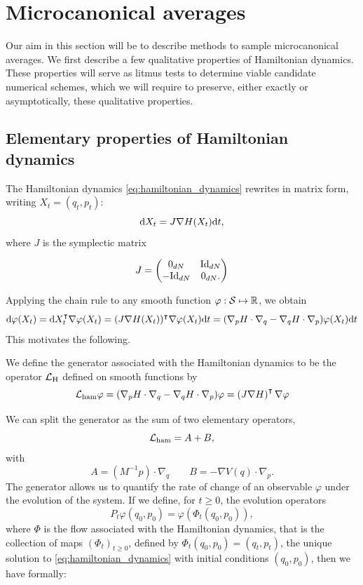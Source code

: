 \section{Microcanonical averages}
Our aim in this section will be to describe methods to sample microcanonical averages. We first describe a few qualitative properties of Hamiltonian dynamics. 
These properties will serve as litmus tests to determine viable candidate numerical schemes, which we will require to preserve, either exactly or asymptotically, 
these qualitative properties.

\subsection{Elementary properties of Hamiltonian dynamics}
The Hamiltonian dynamics \eqref{eq:hamiltonian_dynamics} rewrites in matrix form, writing $X_t=(q_t,p_t)$:
\begin{equation}\label{eq:hamiltonian_dynamics_matrix_form} \text d X_t=J\nabla H(X_t)\mathrm{d}t,\end{equation}
where $J$ is the symplectic matrix

$$J = \begin{pmatrix}
    0_{dN} & \mathrm{Id}_{dN}\\ -\mathrm{Id}_{dN} & 0_{dN}.
\end{pmatrix}$$

Applying the chain rule to any smooth function $\varphi: \mathcal{S} \mapsto \mathbb{R}$, we obtain
        $$ \text d \varphi(X_t)= \text d X_t^{\intercal} \nabla \varphi(X_t)=(J \nabla H(X_t))^\intercal \nabla \varphi(X_t)\mathrm{d}t=(\nabla_p H \cdot \nabla_q - \nabla_q H \cdot \nabla_p)\varphi(X_t)\mathrm{d}t$$
        This motivates the following.
        \begin{definition}
            We define the generator associated with the Hamiltonian dynamics to be the operator $\mathcal{L}_{\text{H}}$ defined on smooth functions by
        \begin{equation}
            \label{eq:hamiltonian_generator}
            \mathcal{L}_{\mathrm{ham}}\varphi=(\nabla_p H \cdot \nabla_q - \nabla_q H \cdot \nabla_p)\varphi=\left(J\nabla H\right)^\intercal \nabla \varphi
        \end{equation}
    \end{definition}
    We can split the generator as the sum of two elementary operators,
    $$\mathcal{L}_{\rm ham}=A+B,$$
    with
    \begin{equation}
        \label{eq:Lham_splitting}
        A=\left(M^{-1}p\right)\cdot \nabla_q \qquad B=-\nabla V(q)\cdot \nabla_p.
    \end{equation}
    The generator allows us to quantify the rate of change of an observable $\varphi$ under the evolution of the system. If we define, for $t\geq 0$, the evolution operators 
    $$P_t \varphi (q_0,p_0) = \varphi(\Phi_t(q_0,p_0)),$$
where $\Phi$ is the flow associated with the Hamiltonian dynamics, that is the collection of maps $(\Phi_t)_{t\geq 0}$, defined by
    $\Phi_t (q_0,p_0) = (q_t,p_t)$, the unique solution to \eqref{eq:hamiltonian_dynamics} with initial conditions  $(q_0,p_0)$, then we have formally:

